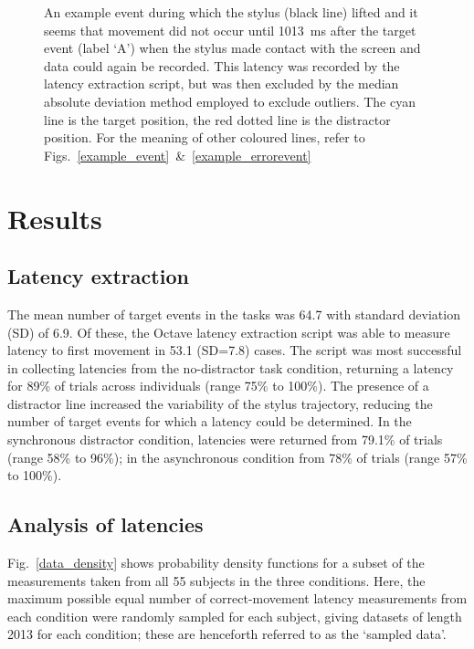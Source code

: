 \documentclass[10pt,letterpaper]{article}
\begin{document}
\begin{figure}[htb!]
\centering
\caption[Stylus lifted] {An example event during which the stylus
  (black line) lifted and it seems that movement did not occur until
  1013~ms after the target event (label `A') when the stylus made
  contact with the screen and data could again be recorded. This
  latency was recorded by the latency extraction script, but was then
  excluded by the median absolute deviation method employed to exclude
  outliers. The cyan line is the target position, the red dotted line
  is the distractor position. For the meaning of other coloured lines,
  refer to Figs.~\ref{example_event}~\&~\ref{example_errorevent}}
\label{stylus_lifted}
\end{figure}


\section*{Results}

\subsection*{Latency extraction}

The mean number of target events in the tasks was 64.7 with standard
deviation (SD) of 6.9. Of these, the Octave latency extraction script
was able to measure latency to first movement in 53.1 (SD=7.8)
cases. The script was most successful in collecting latencies from the
no-distractor task condition, returning a latency for 89\% of trials
across individuals (range 75\% to 100\%). The presence of a distractor
line increased the variability of the stylus trajectory, reducing the
number of target events for which a latency could be determined. In
the synchronous distractor condition, latencies were returned from
79.1\% of trials (range 58\% to 96\%); in the asynchronous condition
from 78\% of trials (range 57\% to 100\%).

\subsection*{Analysis of latencies}

Fig.~\ref{data_density} shows probability density functions for a
subset of the measurements taken from all 55 subjects in the three
conditions. Here, the maximum possible equal number of
correct-movement latency measurements from each condition were
randomly sampled for each subject, giving datasets of length 2013 for
each condition; these are henceforth referred to as the `sampled
data'.
\end{document}
